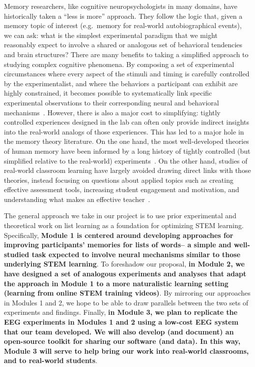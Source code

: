 
Memory researchers, like cognitive neuropsychologists in many domains, have historically taken a ``less is more'' approach.  They follow the logic that, given a memory topic of interest (e.g.\ memory for real-world autobiographical events), we can ask: what is the simplest experimental paradigm that we might reasonably expect to involve a shared or analogous set of behavioral tendencies and brain structures?  There are many benefits to taking a simplified approach to studying complex cognitive phenomena.  By composing a set of experimental circumstances where every aspect of the stimuli and timing is carefully controlled by the experimentalist, and where the behaviors a participant can exhibit are highly constrained, it becomes possible to systematically link specific experimental observations to their corresponding neural and behavioral mechanisms~\citep{OReiMuna00}.  However, there is also a major cost to simplifying: tightly controlled experiences designed in the lab can often only provide indirect insights into the real-world analogs of those experiences.  This has led to a major hole in the memory theory literature.  On the one hand, the most well-developed theories of human memory have been informed by a long history of tightly controlled (but simplified relative to the real-world) experiments~\citep[e.g.\ list-learning, priming, reaction times; ][]{Kaha12}.  On the other hand, studies of real-world classroom learning have largely avoided drawing direct links with those theories, instead focusing on questions about applied topics such as creating effective assessment tools, increasing student engagement and motivation, and understanding what makes an effective teacher~\citep{Seid07}.

The general approach we take in our project is to use prior experimental and theoretical work on list learning as a foundation for optimizing STEM learning.  Specifically, \textbf{Module 1 is centered around developing approaches for improving participants' memories for lists of words-- a simple and well-studied task expected to involve neural mechanisms similar to those underlying STEM learning}.  To foreshadow our proposal, \textbf{in Module 2, we have designed a set of analogous experiments and analyses that adapt the approach in Module 1 to a more naturalistic learning setting (learning from online STEM training videos)}.  By mirroring our approaches in Modules 1 and 2, we hope to be able to draw parallels between the two sets of experiments and findings.  Finally, \textbf{in Module 3, we plan to replicate the EEG experiments in Modules 1 and 2 using a low-cost EEG system that our team developed.  We will also develop (and document) an open-source toolkit for sharing our software (and data).  In this way, Module 3 will serve to help bring our work into real-world classrooms, and to real-world students}.

